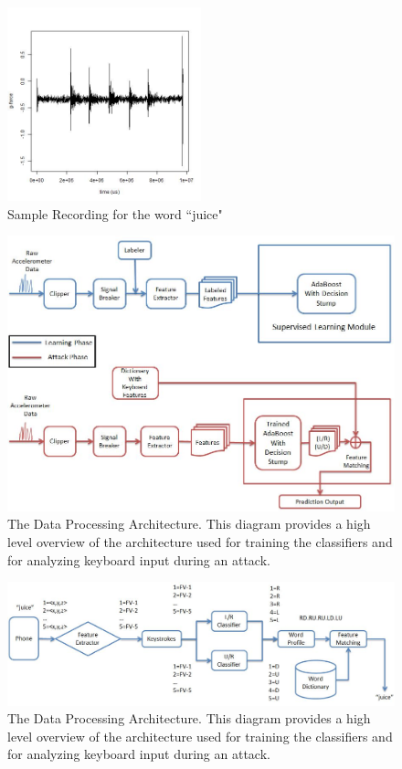 \documentclass[11pt,conference]{IEEEtran}
\begin{document}
\begin{figure}
\centering
\includegraphics[width=0.5\textwidth]{img/juice}
\caption{Sample Recording for the word ``juice"}
\label{fig:juice}
\end{figure}

\begin{figure}
\centering
\includegraphics[width=.9\textwidth]{flowchart1}
\caption{The Data Processing Architecture. This diagram provides a high level overview of the architecture used for training the
classifiers and for analyzing keyboard input during an attack.}
\label{fig:flowchart1}
\end{figure}

\begin{figure}
\centering
\includegraphics[width=.9\textwidth]{flowchart2}
\caption{The Data Processing Architecture. This diagram provides a high level overview of the architecture used for training the
classifiers and for analyzing keyboard input during an attack.}
\label{fig:flowchart2}
\end{figure}
\end{document}
